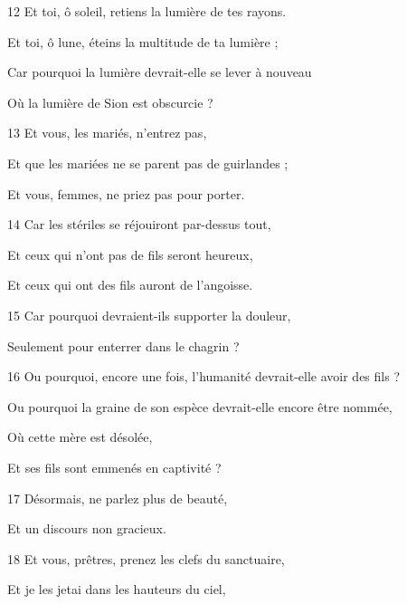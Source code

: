 \par 12 Et toi, ô soleil, retiens la lumière de tes rayons.

\par Et toi, ô lune, éteins la multitude de ta lumière ;

\par Car pourquoi la lumière devrait-elle se lever à nouveau

\par Où la lumière de Sion est obscurcie ?

\par 13 Et vous, les mariés, n'entrez pas,

\par Et que les mariées ne se parent pas de guirlandes ;

\par Et vous, femmes, ne priez pas pour porter.

\par 14 Car les stériles se réjouiront par-dessus tout,

\par Et ceux qui n'ont pas de fils seront heureux,

\par Et ceux qui ont des fils auront de l'angoisse.

\par 15 Car pourquoi devraient-ils supporter la douleur,

\par Seulement pour enterrer dans le chagrin ?

\par 16 Ou pourquoi, encore une fois, l'humanité devrait-elle avoir des fils ?

\par Ou pourquoi la graine de son espèce devrait-elle encore être nommée,

\par Où cette mère est désolée,

\par Et ses fils sont emmenés en captivité ?

\par 17 Désormais, ne parlez plus de beauté,

\par Et un discours non gracieux.

\par 18 Et vous, prêtres, prenez les clefs du sanctuaire,

\par Et je les jetai dans les hauteurs du ciel,

